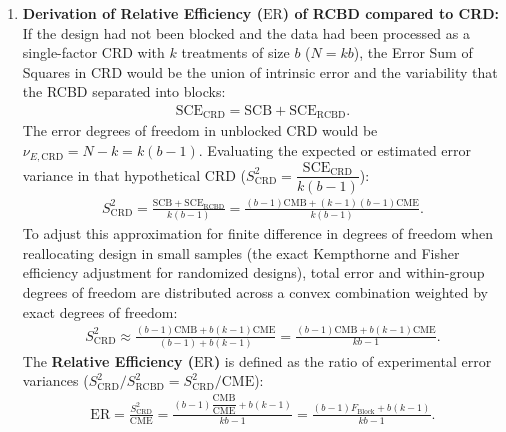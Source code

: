 \begin{solproblema}
\begin{enumerate}
		\item \textbf{Derivation of Relative Efficiency ($\text{ER}$) of RCBD compared to CRD:}
		If the design had not been blocked and the data had been processed as a single-factor CRD with $k$ treatments of size $b$ ($N=kb$), the Error Sum of Squares in CRD would be the union of intrinsic error and the variability that the RCBD separated into blocks:
		\begin{align}
			\text{SCE}_{\text{CRD}} = \text{SCB} + \text{SCE}_{\text{RCBD}}.
		\end{align}
		The error degrees of freedom in unblocked CRD would be $\nu_{E,\text{CRD}} = N - k = k(b - 1)$.
		Evaluating the expected or estimated error variance in that hypothetical CRD ($S_{\text{CRD}}^2 = \dfrac{\text{SCE}_{\text{CRD}}}{k(b-1)}$):
		\begin{align}
			S_{\text{CRD}}^2 = \frac{\text{SCB} + \text{SCE}_{\text{RCBD}}}{k(b - 1)} = \frac{(b-1)\text{CMB} + (k-1)(b-1)\text{CME}}{k(b-1)}.
		\end{align}
		To adjust this approximation for finite difference in degrees of freedom when reallocating design in small samples (the exact Kempthorne and Fisher efficiency adjustment for randomized designs), total error and within-group degrees of freedom are distributed across a convex combination weighted by exact degrees of freedom:
		\begin{align}
			S_{\text{CRD}}^2 \approx \frac{(b-1)\text{CMB} + b(k-1)\text{CME}}{(b-1) + b(k-1)} = \frac{(b-1)\text{CMB} + b(k-1)\text{CME}}{kb - 1}.
		\end{align}
		The \textbf{Relative Efficiency ($\text{ER}$)} is defined as the ratio of experimental error variances ($S_{\text{CRD}}^2 / S_{\text{RCBD}}^2 = S_{\text{CRD}}^2 / \text{CME}$):
		\begin{align}
			\text{ER} = \frac{S_{\text{CRD}}^2}{\text{CME}} = \frac{(b-1)\dfrac{\text{CMB}}{\text{CME}} + b(k-1)}{kb - 1} = \frac{(b-1)F_{\text{Block}} + b(k-1)}{kb - 1}.
		\end{align}
		

\end{enumerate}
\end{solproblema}
